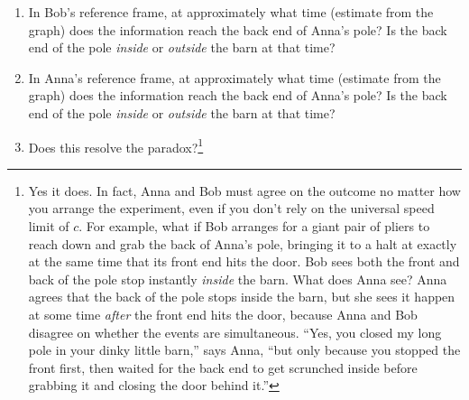 \begin{enumerate}[labparts]
\item In Bob's reference frame, at approximately what time (estimate from the graph) does the information reach the back end of Anna's pole?  Is the back end of the pole \textit{inside} or \textit{outside} the barn at that time?
\answerspace{0.8in}

\item In Anna's reference frame, at approximately what time (estimate from the graph) does the information reach the back end of Anna's pole?  Is the back end of the pole \textit{inside} or \textit{outside} the barn at that time?
\answerspace{0.8in}

\item Does this resolve the paradox?\footnote{Yes it does.  In fact, Anna and Bob must agree on the outcome no matter how you arrange the experiment, even if you don't rely on the universal speed limit of $c$.  For example, what if Bob arranges for a giant pair of pliers to reach down and grab the back of Anna's pole, bringing it to a halt at exactly at the same time that its front end hits the door.  Bob sees both the front and back of the pole stop instantly \textit{inside} the barn.  What does Anna see?  Anna agrees that the back of the pole stops inside the barn, but she sees it happen at some time \textit{after} the front end hits the door, because Anna and Bob disagree on whether the events are simultaneous. ``Yes, you closed my long pole in your dinky little barn,'' says Anna, ``but only because you stopped the front first, then waited for the back end to get scrunched inside before grabbing it and closing the door behind it.''}
\answerspace{0.8in}

\end{enumerate}

